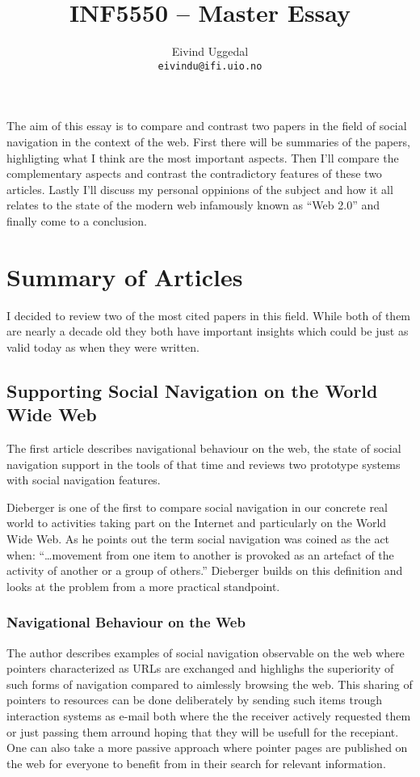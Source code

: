 \documentclass[12pt,a4paper]{article}
\author{Eivind Uggedal\\
  \texttt{eivindu@ifi.uio.no}}
\title{INF5550 -- Master Essay}
\begin{document}
\maketitle{}

The aim of this essay is to compare and contrast two papers in the field of
social navigation in the context of the web. First there will be summaries
of the papers, highligting what I think are the most important aspects.
Then I'll compare the complementary aspects and contrast the contradictory
features of these two articles. Lastly I'll discuss my personal
oppinions of the subject and how it all relates to the state of the modern web
infamously known as ``Web 2.0'' and finally come to a conclusion.

\cite{wexelblat99}
\cite{dieberger97}

\section{Summary of Articles}

I decided to review two of the most cited papers in this field. While both of
them are nearly a decade old they both have important insights which could be
just as valid today as when they were written.

\subsection{Supporting Social Navigation on the World Wide Web}
The first article \cite{dieberger97} describes navigational behaviour on the
web, the state of social navigation support in the tools of that time and
reviews two prototype systems with social navigation features.

Dieberger is one of the first to compare social navigation in our concrete
real world to activities taking part on the Internet and particularly on the
World Wide Web. As he points out the term social navigation was coined as the
act when:
``\ldots movement from one item to another is provoked as an artefact of the
activity of another or a group of others.'' \cite{dourish94} Dieberger builds
on this definition and looks at the problem from a more practical standpoint.

\subsubsection{Navigational Behaviour on the Web}

The author describes examples of social navigation observable on the web where
pointers characterized as URLs are exchanged and highlighs the superiority of
such forms of navigation compared to aimlessly browsing the web. This sharing
of pointers to resources can be done deliberately by sending such
items trough interaction systems as e-mail both where the the receiver
actively requested them or just passing them arround hoping that they
will be usefull for the recepiant. One can also take a more passive approach
where pointer pages are published on the web for everyone to benefit from in
their search for relevant information.
\end{document}
